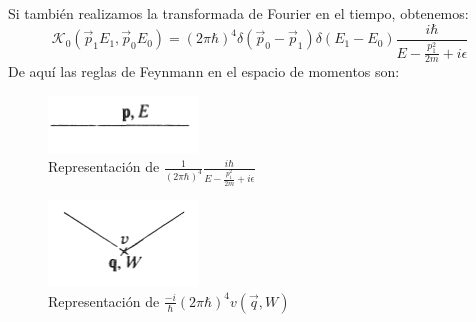 Si también realizamos la transformada de Fourier en el tiempo, obtenemos:
\begin{equation}
\mathcal{K}_0(\vec{p}_1E_1,\vec{p}_0E_0)=(2\pi\hbar)^4\delta(\vec{p}_0-\vec{p}_1)\delta(E_1-E_0)\frac{i\hbar}{E-\frac{p_{1}^{2}}{2m}+i\epsilon}
\end{equation}
De aquí las reglas de Feynmann en el espacio de momentos son:
\begin{figure}
\caption[Diagrama de Feynmann primera cuantización]{Representación de $\frac{1}{(2\pi\hbar)^4}\frac{i\hbar}{E-\frac{p_{1}^{2}}{2m}+i\epsilon}$}
\includegraphics[width=4cm]{Imagenes/Fig6}
\end{figure}
\begin{figure}
\caption[Diagrama de Feynmann primera cuantización]{Representación de $\frac{-i}{\hbar}(2\pi\hbar)^4v(\vec{q},W)$}
\includegraphics[width=4cm]{Imagenes/Fig7}
\end{figure}

